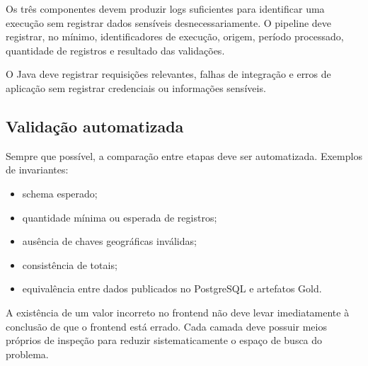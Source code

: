 Os três componentes devem produzir logs suficientes para identificar uma execução sem registrar dados sensíveis desnecessariamente. O pipeline deve registrar, no mínimo, identificadores de execução, origem, período processado, quantidade de registros e resultado das validações.

O Java deve registrar requisições relevantes, falhas de integração e erros de aplicação sem registrar credenciais ou informações sensíveis.

\subsection{Validação automatizada}

Sempre que possível, a comparação entre etapas deve ser automatizada. Exemplos de invariantes:

\begin{itemize}
    \item schema esperado;
    \item quantidade mínima ou esperada de registros;
    \item ausência de chaves geográficas inválidas;
    \item consistência de totais;
    \item equivalência entre dados publicados no PostgreSQL e artefatos Gold.
\end{itemize}

\begin{regra}
A existência de um valor incorreto no frontend não deve levar imediatamente à conclusão de que o frontend está errado. Cada camada deve possuir meios próprios de inspeção para reduzir sistematicamente o espaço de busca do problema.
\end{regra}
